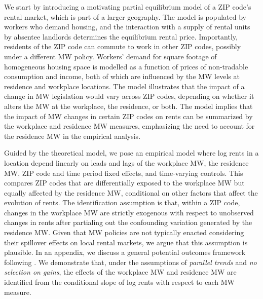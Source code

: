 
We start by introducing a motivating partial equilibrium model of a ZIP code's 
rental market, which is part of a larger geography.
The model is populated by workers who demand housing, and the interaction with 
a supply of rental units by absentee landlords determines the equilibrium 
rental price.
Importantly, residents of the ZIP code can commute to work in other ZIP 
codes, possibly under a different MW policy.
Workers' demand for square footage of homogeneous housing space is modelled as 
a function of prices of non-tradable consumption and income, both of which are 
influenced by the MW levels at residence and workplace locations.
The model illustrates that the impact of a change in MW legislation would vary 
across ZIP codes, depending on whether it alters the MW at the workplace,
the residence, or both.
The model implies that the impact of MW changes in certain ZIP codes on rents 
can be summarized by the workplace and residence MW measures,
emphasizing the need to account for the residence MW in the empirical analysis.


Guided by the theoretical model, we pose an empirical model where log rents in 
a location depend linearly on
leads and lags of the workplace MW,
the residence MW,
ZIP code and time period fixed effects, and 
time-varying controls.
This compares ZIP codes that are differentially exposed to the workplace MW 
but equally affected by the residence MW, conditional on other factors that 
affect the evolution of rents.
The identification assumption is that, within a ZIP code, 
changes in the workplace MW are strictly exogenous with respect to 
unobserved changes in rents after partialing out the confounding variation 
generated by the residence MW.
Given that MW policies are not typically enacted considering their spillover
effects on local rental markets, we argue that this assumption is plausible.
In an appendix, we discuss a general potential outcomes framework following
\textcite{CallawayEtAl2021}.
We demonstrate that, under the assumptions of \textit{parallel trends} and 
\textit{no selection on gains}, 
the effects of the workplace MW and residence MW are identified from the 
conditional slope of log rents with respect to each MW measure.

